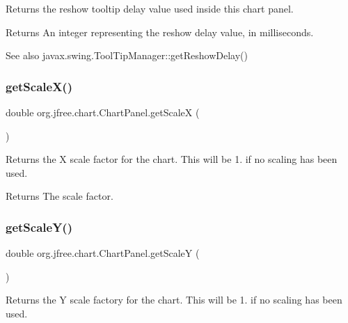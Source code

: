 Returns the reshow tooltip delay value used inside this chart panel.

\begin{DoxyReturn}{Returns}
An integer representing the reshow delay value, in milliseconds.
\end{DoxyReturn}
\begin{DoxySeeAlso}{See also}
javax.\+swing.\+Tool\+Tip\+Manager\+::get\+Reshow\+Delay() 
\end{DoxySeeAlso}
\mbox{\label{classorg_1_1jfree_1_1chart_1_1_chart_panel_afafa2053d0e1e22fc5d4de6ad04bc82e}} 
\subsubsection{\texorpdfstring{get\+Scale\+X()}{getScaleX()}}
{\footnotesize\ttfamily double org.\+jfree.\+chart.\+Chart\+Panel.\+get\+ScaleX (\begin{DoxyParamCaption}{ }\end{DoxyParamCaption})}

Returns the X scale factor for the chart. This will be 1. if no scaling has been used.

\begin{DoxyReturn}{Returns}
The scale factor. 
\end{DoxyReturn}
\mbox{\label{classorg_1_1jfree_1_1chart_1_1_chart_panel_aa5aff48954f7f9f4bb1cd78fd84f5ab7}} 
\subsubsection{\texorpdfstring{get\+Scale\+Y()}{getScaleY()}}
{\footnotesize\ttfamily double org.\+jfree.\+chart.\+Chart\+Panel.\+get\+ScaleY (\begin{DoxyParamCaption}{ }\end{DoxyParamCaption})}

Returns the Y scale factory for the chart. This will be 1. if no scaling has been used.


